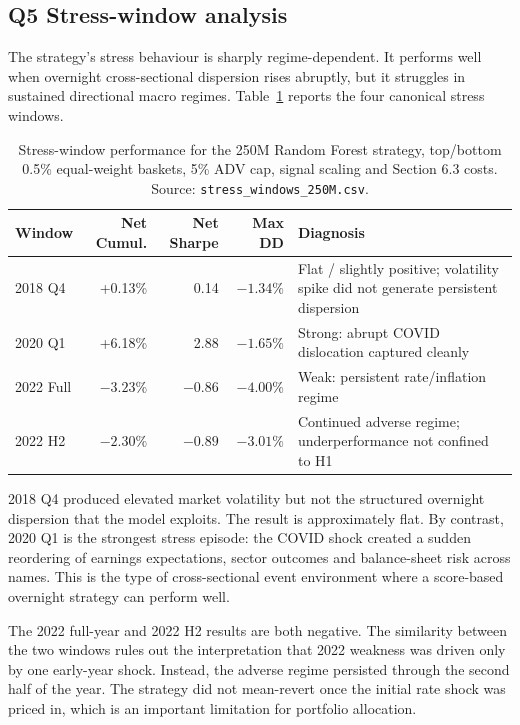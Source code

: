 \documentclass[12pt,a4paper]{article}
\begin{document}
\subsection*{Q5 \quad Stress-window analysis}

The strategy's stress behaviour is sharply regime-dependent. It performs well
when overnight cross-sectional dispersion rises abruptly, but it struggles in
sustained directional macro regimes. Table~\ref{tab:step5_stress} reports the
four canonical stress windows.

\begin{table}[H]
\centering
\caption{Stress-window performance for the 250M Random Forest strategy, top/bottom 0.5\% equal-weight baskets, 5\% ADV cap, signal scaling and Section 6.3 costs. Source: \texttt{stress\_windows\_250M.csv}.}
\label{tab:step5_stress}
\small
\begin{tabular}{p{2.2cm} rrr p{5.7cm}}
\toprule
\textbf{Window} & \textbf{Net Cumul.} & \textbf{Net Sharpe} & \textbf{Max DD} & \textbf{Diagnosis} \\
\midrule
2018 Q4 & +0.13\% & 0.14 & $-1.34\%$ & Flat / slightly positive; volatility spike did not generate persistent dispersion \\
2020 Q1 & +6.18\% & 2.88 & $-1.65\%$ & Strong: abrupt COVID dislocation captured cleanly \\
2022 Full & $-3.23\%$ & $-0.86$ & $-4.00\%$ & Weak: persistent rate/inflation regime \\
2022 H2 & $-2.30\%$ & $-0.89$ & $-3.01\%$ & Continued adverse regime; underperformance not confined to H1 \\
\bottomrule
\end{tabular}
\end{table}

2018 Q4 produced elevated market volatility but not the structured overnight
dispersion that the model exploits. The result is approximately flat. By
contrast, 2020 Q1 is the strongest stress episode: the COVID shock created a
sudden reordering of earnings expectations, sector outcomes and balance-sheet
risk across names. This is the type of cross-sectional event environment where a
score-based overnight strategy can perform well.

The 2022 full-year and 2022 H2 results are both negative. The similarity between
the two windows rules out the interpretation that 2022 weakness was driven only
by one early-year shock. Instead, the adverse regime persisted through the second
half of the year. The strategy did not mean-revert once the initial rate shock was
priced in, which is an important limitation for portfolio allocation.
\end{document}
